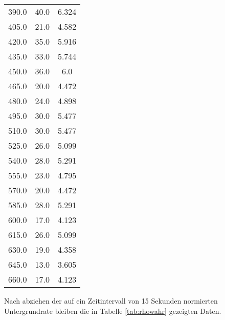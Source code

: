 \begin{table}
\begin{tabular}{c c c}
  390.0   & 40.0   & 6.324  \\  
  405.0   & 21.0   & 4.582  \\  
  420.0   & 35.0   & 5.916  \\  
  435.0   & 33.0   & 5.744  \\  
  450.0   & 36.0   & 6.0     \\  
  465.0   & 20.0   & 4.472  \\  
  480.0   & 24.0   & 4.898  \\  
  495.0   & 30.0   & 5.477  \\  
  510.0   & 30.0   & 5.477  \\  
  525.0   & 26.0   & 5.099  \\  
  540.0   & 28.0   & 5.291  \\  
  555.0   & 23.0   & 4.795  \\  
  570.0   & 20.0   & 4.472  \\  
  585.0   & 28.0   & 5.291  \\  
  600.0   & 17.0   & 4.123  \\  
  615.0   & 26.0   & 5.099  \\  
  630.0   & 19.0   & 4.358  \\  
  645.0   & 13.0   & 3.605  \\  
  660.0   & 17.0   & 4.123 \\
  \bottomrule
 \end{tabular}
\end{table} 

Nach abziehen der auf ein Zeitintervall von 15 Sekunden normierten Untergrundrate
bleiben die in Tabelle \ref{tab:rhowahr} 
gezeigten Daten.

